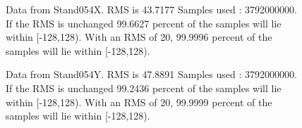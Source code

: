 \begin{figure}[ht] 				 				 				\caption{Data from Stand054X. RMS is 43.7177 Samples used : 3792000000. If the RMS is unchanged 99.6627 percent of the samples will lie within [-128,128).  				 With an RMS of 20, 99.9996 percent of the samples will lie within [-128,128).} 				\end{figure} 

\begin{figure}[ht] 				 				 				\caption{Data from Stand054Y. RMS is 47.8891 Samples used : 3792000000. If the RMS is unchanged 99.2436 percent of the samples will lie within [-128,128).  				 With an RMS of 20, 99.9999 percent of the samples will lie within [-128,128).} 				\end{figure} 

